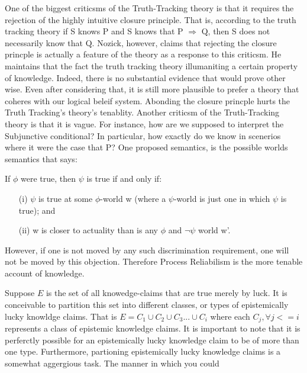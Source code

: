 \documentclass{article}
\begin{document}
One of the biggest criticsms of the Truth-Tracking theory is that it requires
the rejection of the highly intuitive closure principle. That is, according
to the truth tracking theory if S knows P and S  knows that  P $\Rightarrow$ Q,
then S does not necessarily know that Q. Nozick, however, claims that rejecting
the closure princple is actually a feature of the theory as a response to this
criticsm. He maintains that the fact the truth tracking theory illumaniting a
certain property of knowledge. Indeed, there is no substantial evidence that would
prove other wise. Even after considering that, it is still more plausible
to prefer a theory that coheres with our logical beleif system. Abonding the
closure princple hurts the Truth Tracking's theory's tenablity. Another criticsm
of the Truth-Tracking theory is that it is vague. For instance, how are we
supposed to interpret the Subjunctive conditional? In particular, how exactly
do we know in scenerios where it were the case that P? One proposed semantics, is
the possible worlds semantics that says:
\begin{displayquote}
    If $\phi$ were true, then $\psi$ is true if and only if:
  \begin{enumerate}
    \item[(i)] $\psi$ is true at some $\phi$-world w
    (where a $\psi$-world is just one in which $\psi$ is true); and
    \item[(ii)] w is closer to actuality than is any $\phi$ and $\neg \psi$
    world w'.
  \end{enumerate}
\end{displayquote}

However, if one is not moved by any such discrimination requirement,
one will not be moved by this objection. Therefore Process Reliabilism
is the more tenable account of knowledge.



Suppose $E$ is the set of all knowedge-claims that are true merely by luck.
It is conceivable to partition this set into different classes, or types
of epistemically lucky knowldge claims. That is $E = C_{1} \cup C_{2} \cup
C_{3} ... \cup C_{i}$ where each $C_{j}, \forall j <= i$ represents a class
of epistemic knowledge claims. It is important to note that it is perferctly
possible for an epistemically lucky knowledge claim to be of more than one type.
Furthermore, partioning epistemically lucky knowledge claims is a somewhat
aggergious task. The manner in which you could
\end{document}
